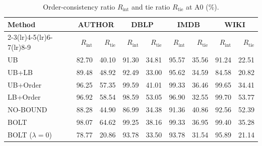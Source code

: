\begin{table}[t]
\centering
\small
\setlength{\tabcolsep}{3pt}
\caption{Order-consistency ratio $R_{\mathrm{int}}$ and tie ratio $R_{\mathrm{tie}}$ at A0 (\%).}
\label{tab:order-consistency-view}
\begin{tabular*}{\textwidth}{@{\extracolsep{\fill}}lrrrrrrrr@{}}
\toprule
Method & \multicolumn{2}{c}{AUTHOR} & \multicolumn{2}{c}{DBLP} & \multicolumn{2}{c}{IMDB} & \multicolumn{2}{c}{WIKI} \\
\cmidrule(lr){2-3}\cmidrule(lr){4-5}\cmidrule(lr){6-7}\cmidrule(lr){8-9}
 & $R_{\mathrm{int}}$ & $R_{\mathrm{tie}}$ & $R_{\mathrm{int}}$ & $R_{\mathrm{tie}}$ & $R_{\mathrm{int}}$ & $R_{\mathrm{tie}}$ & $R_{\mathrm{int}}$ & $R_{\mathrm{tie}}$ \\
\midrule
UB & 82.70 & 40.10 & 91.30 & 34.81 & 95.57 & 35.56 & 91.24 & 22.51 \\
UB+LB & 89.48 & 48.92 & 92.49 & 33.00 & 95.62 & 34.59 & 84.58 & 20.82 \\
UB+Order & 96.25 & 57.35 & 99.59 & 41.01 & 99.33 & 36.46 & 99.65 & 34.41 \\
LB+Order & 96.92 & 58.54 & 98.59 & 53.05 & 96.90 & 32.55 & 99.70 & 53.77 \\
NO-BOUND & 88.28 & 44.90 & 86.99 & 34.38 & 91.36 & 40.86 & 92.56 & 52.39 \\
BOLT & 98.07 & 64.62 & 99.25 & 38.16 & 99.33 & 36.95 & 99.40 & 35.28 \\
BOLT ($\lambda=0$) & 78.77 & 20.86 & 93.78 & 33.50 & 93.78 & 31.54 & 95.89 & 21.14 \\
\bottomrule
\end{tabular*}
\end{table}
